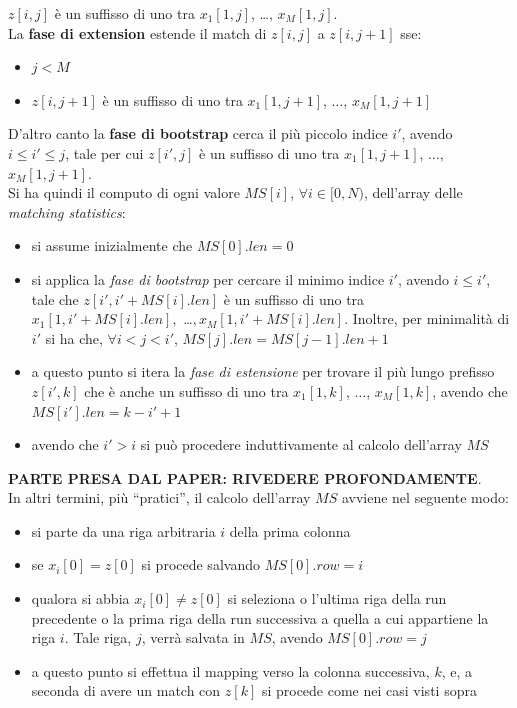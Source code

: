 $z[i,j]$ è un suffisso di uno tra $x_1[1,j]$, \ldots, $x_M[1,j]$. \\
La \textbf{fase di extension} estende il match di $z[i,j]$ a $z[i,j+1]$ sse:
\begin{itemize}
  \item $j<M$
  \item $z[i,j+1]$ è un suffisso di uno tra $x_1[1,j+1]$, $\ldots$, $x_M[1,j+1]$
\end{itemize}
D'altro canto la \textbf{fase di bootstrap} cerca il più piccolo indice $i'$,
avendo $i\leq i'\leq j$, tale per cui $z[i',j]$ è un suffisso di uno tra
$x_1[1,j+1]$, $\ldots$, $x_M[1,j+1]$.\\
Si ha quindi il computo di ogni valore $MS[i]$, $\forall i\in[0,N)$, dell'array
delle \textit{matching statistics}:
\begin{itemize}
  \item si assume inizialmente che $MS[0].len=0$
  \item si applica la \textit{fase di bootstrap} per cercare il minimo indice
  $i'$, avendo $i\leq i'$, tale che $z[i',i'+MS[i].len]$ è un suffisso di uno
  tra $x_1[1,i'+MS[i].len],$ \ldots$, x_M[1,i'+MS[i].len]$. Inoltre, per
  minimalità di $i'$ si ha che, $\forall i<j<i'$, $MS[j].len=MS[j-1].len+1$
  \item a questo punto si itera la \textit{fase di estensione} per trovare il
  più lungo prefisso $z[i',k]$ che è anche un suffisso di uno tra $x_1[1,k]$,
  $\ldots$, $x_M[1,k]$, avendo che $MS[i'].len=k-i'+1$
  \item avendo che $i'>i$ si può procedere induttivamente al calcolo dell'array
  $MS$ 
\end{itemize}
\textbf{PARTE PRESA DAL PAPER: RIVEDERE PROFONDAMENTE}.\\
In altri termini, più ``pratici'', il calcolo dell'array $MS$ avviene nel
seguente modo:
\begin{itemize}
  \item si parte da una riga arbitraria $i$ della prima colonna
  \item se $x_i[0]=z[0]$ si procede salvando $MS[0].row=i$
  \item qualora si abbia $x_i[0]\neq z[0]$ si seleziona o l'ultima riga della
  run precedente o la prima riga della run successiva a quella a cui appartiene
  la riga $i$. Tale riga, $j$, verrà salvata in $MS$, avendo $MS[0].row=j$
  \item a questo punto si effettua il mapping verso la colonna successiva, $k$,
  e, a seconda di avere un match con $z[k]$ si procede come nei casi visti sopra
\end{itemize}
